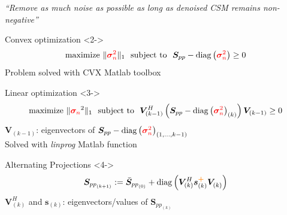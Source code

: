 \documentclass[10pt,xcolor=x11names,compress, notes=show]{beamer}%
\newcommand{\diag}[1]{\operatorname{diag}\left(#1\right)}
\newcommand{\citeTransp}[1]{\color{fg!50} \citep{#1}}
\begin{document}
\begin{frame}{\insertsectionhead}	
\hspace{-0.6cm}\textit{\small ``Remove as much noise as possible as long as denoised CSM remains non-negative''}
	\begin{block}{\normalsize Convex optimization   \citeTransp{Hald2017}}<2->
		\begin{equation*}
        			\text{maximize~} \| \textcolor{red}{\bm{\sigma}_{n}^2}\|_1 \text{~~subject to~~} \bm{S}_{pp}- \diag{\textcolor{red}{\bm{\sigma}_n^2}} \geq 0
		\end{equation*}
		{\small Problem solved with CVX Matlab toolbox}
	\end{block}
	\begin{block}{\normalsize Linear optimization \citeTransp{dougherty2016}}<3->
		\vspace{-0.2cm}
		\begin{equation*}
			\text{maximize~} \| \textcolor{red}{\bm{\sigma}_{n}}^2\|_1   \text{~~subject to~~}  \bm{V}^{H}_{(k-1)} \left( \bm{S}_{pp}- \diag{\textcolor{red}{\bm{\sigma}_n^2}}_{(k)} \right) \bm{V}_{(k-1)} \geq 0 
		\end{equation*}
		 $\bm{V}_{(k-1)}$: eigenvectors of $\bm{S}_{pp}-\diag{\textcolor{red}{\bm{\sigma}_n^2}}_{(1,...,k-1)} $\\[1pt]
		{\small Solved with \textit{linprog} Matlab function}
	\end{block}
	\begin{block}{\normalsize Alternating Projections  \citeTransp{leclere:hal-01279944}}<4->
		\begin{equation*}
        			 \bm{S}_{{pp}_{(k+1)}} := \bar{\bm{S}}_{{pp}_{(0)}} + \diag{\bm{V}^{H}_{(k)} \bm{s}_{(k)}^{\textcolor{orange}{\textbf{+}}}\bm{V}^{~}_{(k)}}
		\end{equation*}
		$\bm{V}^{H}_{(k)}$ and $\bm{s}_{(k)}$: eigenvectors/values of  $\bm{S}_{{pp}_{(k)}}$\\[1pt]
	\end{block}	
\end{frame}

\end{document}
